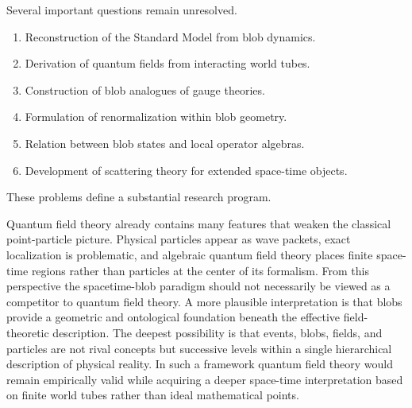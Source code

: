 Several important questions remain unresolved.
\begin{enumerate}
\item Reconstruction of the Standard Model from blob dynamics.
\item Derivation of quantum fields from interacting world tubes.
\item Construction of blob analogues of gauge theories.
\item Formulation of renormalization within blob geometry.
\item Relation between blob states and local operator algebras.
\item Development of scattering theory for extended space-time objects.
\end{enumerate}
These problems define a substantial research program.

Quantum field theory already contains many features that weaken the
classical point-particle picture. Physical particles appear as
wave packets, exact localization is problematic, and algebraic quantum
field theory places finite space-time regions rather than particles at
the center of its formalism.
From this perspective the spacetime-blob paradigm should not necessarily
be viewed as a competitor to quantum field theory. A more plausible
interpretation is that blobs provide a geometric and ontological
foundation beneath the effective field-theoretic description.
The deepest possibility is that events, blobs, fields, and particles are
not rival concepts but successive levels within a single hierarchical
description of physical reality. In such a framework quantum field
theory would remain empirically valid while acquiring a deeper
space-time interpretation based on finite world tubes rather than ideal
mathematical points.

